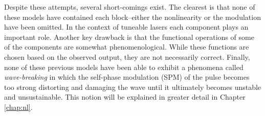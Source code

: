 Despite these attempts, several short-comings exist. The clearest is that none of these models have contained each block--either the nonlinearity or the modulation have been omitted. In the context of tuneable lasers each component plays an important role. Another key drawback is that the functional operations of some of the components are somewhat phenomenological. While these functions are chosen based on the observed output, they are not necessarily correct. Finally, none of these previous models have been able to exhibit a phenomena called \emph{wave-breaking} in which the self-phase modulation (SPM) of the pulse becomes too strong distorting and damaging the wave until it ultimately becomes unstable and unsustainable. This notion will be explained in greater detail in Chapter \ref{chap:nl}. \\

